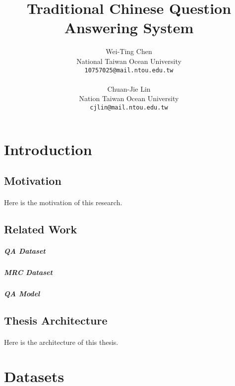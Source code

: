 \documentclass{article}
\title{Traditional Chinese Question Answering System}
\author{
  Wei-Ting Chen\\
  National Taiwan Ocean University\\
  \texttt{10757025@mail.ntou.edu.tw}\\
  \\
  Chuan-Jie Lin\\
  Nation Taiwan Ocean University\\
  \texttt{cjlin@mail.ntou.edu.tw}\\
}
\begin{document}
\maketitle
{}

\newpage

\doublespacing
\tableofcontents
\singlespacing

\newpage

\section{Introduction}

\subsection{Motivation}
\paragraph{}
Here is the motivation of this research.

\subsection{Related Work}
\paragraph{}

\subparagraph{QA Dataset}

\subparagraph{MRC Dataset}

\subparagraph{QA Model}

\subsection{Thesis Architecture}
\paragraph{}
Here is the architecture of this thesis.


\section{Datasets}
\end{document}
